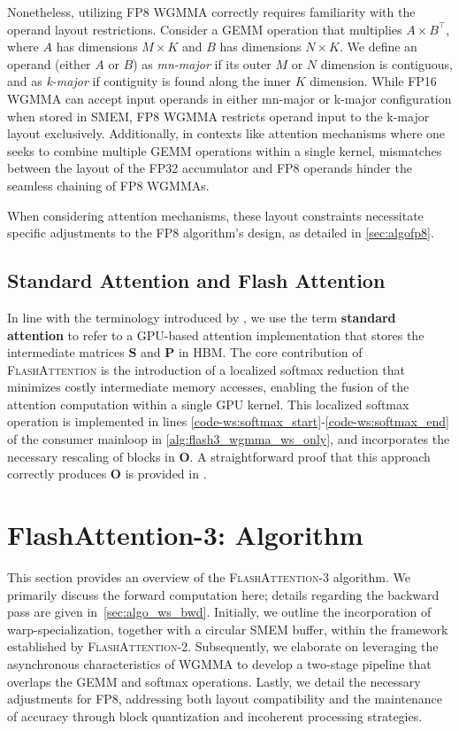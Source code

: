 \begin{enumerate}
Nonetheless, utilizing FP8 WGMMA correctly requires familiarity with the operand layout restrictions. Consider a GEMM operation that multiplies $A \times B^{\top}$, where $A$ has dimensions $M\times K$ and $B$ has dimensions $N\times K$. We define an operand (either $A$ or $B$) as \emph{mn-major} if its outer $M$ or $N$ dimension is contiguous, and as \emph{k-major} if contiguity is found along the inner $K$ dimension. While FP16 WGMMA can accept input operands in either mn-major or k-major configuration when stored in SMEM, FP8 WGMMA restricts operand input to the k-major layout exclusively. Additionally, in contexts like attention mechanisms where one seeks to combine multiple GEMM operations within a single kernel, mismatches between the layout of the FP32 accumulator and FP8 operands hinder the seamless chaining of FP8 WGMMAs.

When considering attention mechanisms, these layout constraints necessitate specific adjustments to the FP8 algorithm’s design, as detailed in \cref{sec:algofp8}.

\subsection{Standard Attention and Flash Attention} In line with the terminology introduced by \citet{dao2022flashattention}, we use the term \textbf{standard attention} to refer to a GPU-based attention implementation that stores the intermediate matrices $\mathbf{S}$ and $\mathbf{P}$ in HBM. The core contribution of \textsc{FlashAttention} is the introduction of a localized softmax reduction that minimizes costly intermediate memory accesses, enabling the fusion of the attention computation within a single GPU kernel. This localized softmax operation is implemented in lines \ref{code-ws:softmax_start}-\ref{code-ws:softmax_end} of the consumer mainloop in \cref{alg:flash3_wgmma_ws_only}, and incorporates the necessary rescaling of blocks in $\mathbf{O}$. A straightforward proof that this approach correctly produces $\mathbf{O}$ is provided in \cite[\S 2.3.1]{dao2023flashattention2}.

\section{FlashAttention-3: Algorithm}
\label{sec:algo}

This section provides an overview of the \textsc{FlashAttention-3} algorithm. We primarily discuss the forward computation here; details regarding the backward pass are given in~\cref{sec:algo_ws_bwd}. Initially, we outline the incorporation of warp-specialization, together with a circular SMEM buffer, within the framework established by \textsc{FlashAttention-2}. Subsequently, we elaborate on leveraging the asynchronous characteristics of WGMMA to develop a two-stage pipeline that overlaps the GEMM and softmax operations. Lastly, we detail the necessary adjustments for FP8, addressing both layout compatibility and the maintenance of accuracy through block quantization and incoherent processing strategies.


\end{enumerate}
